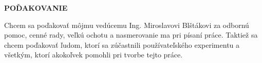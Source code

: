 \newpage
\thispagestyle{plain}
\vspace*{15cm} 
\begin{large}
\noindent
\textbf{POĎAKOVANIE} \\
\end{large}
\noindent
Chcem sa poďakovať môjmu vedúcemu Ing. Miroslavovi Blštákovi za odbornú pomoc, cenné rady, veľkú ochotu a nasmerovanie ma pri písaní práce. Taktiež sa chcem poďakovať ľudom, ktorí sa zúčastnili používateľského experimentu a všetkým, ktorí akokoľvek pomohli pri tvorbe tejto práce.
\newpage
{}

\setcounter{page}{7}

